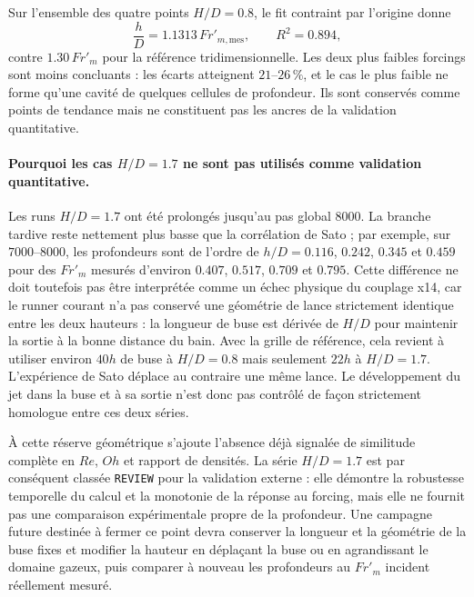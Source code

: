 \documentclass[11pt,a4paper]{article}
\begin{document}
Sur l'ensemble des quatre points $H/D=0.8$, le fit contraint par l'origine donne
\begin{equation}
  \frac{h}{D}=1.1313\,Fr'_{m,\mathrm{mes}},
  \qquad R^2=0.894,
\end{equation}
contre $1.30\,Fr'_m$ pour la référence tridimensionnelle. Les deux plus faibles forcings sont moins concluants : les écarts atteignent $21$--$26\,\%$, et le cas le plus faible ne forme qu'une cavité de quelques cellules de profondeur. Ils sont conservés comme points de tendance mais ne constituent pas les ancres de la validation quantitative.

\paragraph{Pourquoi les cas $H/D=1.7$ ne sont pas utilisés comme validation quantitative.}
Les runs $H/D=1.7$ ont été prolongés jusqu'au pas global 8000. La branche tardive reste nettement plus basse que la corrélation de Sato ; par exemple, sur $7000$--$8000$, les profondeurs sont de l'ordre de $h/D=0.116$, $0.242$, $0.345$ et $0.459$ pour des $Fr'_m$ mesurés d'environ $0.407$, $0.517$, $0.709$ et $0.795$. Cette différence ne doit toutefois pas être interprétée comme un échec physique du couplage x14, car le runner courant n'a pas conservé une géométrie de lance strictement identique entre les deux hauteurs : la longueur de buse est dérivée de $H/D$ pour maintenir la sortie à la bonne distance du bain. Avec la grille de référence, cela revient à utiliser environ $40h$ de buse à $H/D=0.8$ mais seulement $22h$ à $H/D=1.7$. L'expérience de Sato déplace au contraire une même lance. Le développement du jet dans la buse et à sa sortie n'est donc pas contrôlé de façon strictement homologue entre ces deux séries.

À cette réserve géométrique s'ajoute l'absence déjà signalée de similitude complète en $Re$, $Oh$ et rapport de densités. La série $H/D=1.7$ est par conséquent classée \texttt{REVIEW} pour la validation externe : elle démontre la robustesse temporelle du calcul et la monotonie de la réponse au forcing, mais elle ne fournit pas une comparaison expérimentale propre de la profondeur. Une campagne future destinée à fermer ce point devra conserver la longueur et la géométrie de la buse fixes et modifier la hauteur en déplaçant la buse ou en agrandissant le domaine gazeux, puis comparer à nouveau les profondeurs au $Fr'_m$ incident réellement mesuré.
\end{document}
